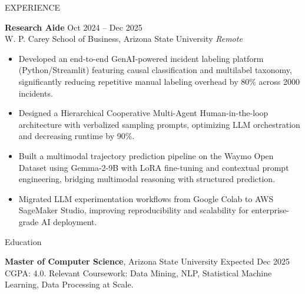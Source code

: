 \documentclass{resume} %
\begin{document}
\begin{rSection}{EXPERIENCE}

\textbf{Research Aide} \hfill Oct 2024 -- Dec 2025\\
W. P. Carey School of Business, Arizona State University \hfill \textit{Remote}
 \begin{itemize}
    \itemsep -3pt {}
     \item Developed an end-to-end GenAI-powered incident labeling platform (Python/Streamlit) featuring causal classification and multilabel taxonomy, significantly reducing repetitive manual labeling overhead by 80\% across 2000 incidents.
     \item Designed a Hierarchical Cooperative Multi-Agent Human-in-the-loop architecture with verbalized sampling prompts, optimizing LLM orchestration and decreasing runtime by 90\%.
     \item Built a multimodal trajectory prediction pipeline on the Waymo Open Dataset using Gemma-2-9B with LoRA fine-tuning and contextual prompt engineering, bridging multimodal reasoning with structured prediction.
     \item Migrated LLM experimentation workflows from Google Colab to AWS SageMaker Studio, improving reproducibility and scalability for enterprise-grade AI deployment.
 \end{itemize}

\end{rSection}

\begin{rSection}{Education}

{\bf Master of Computer Science}, Arizona State University \hfill {Expected Dec 2025}\\
CGPA: 4.0. Relevant Coursework: Data Mining, NLP, Statistical Machine Learning, Data Processing at Scale.

\end{rSection}
\vspace{-5 pt}
\end{document}
